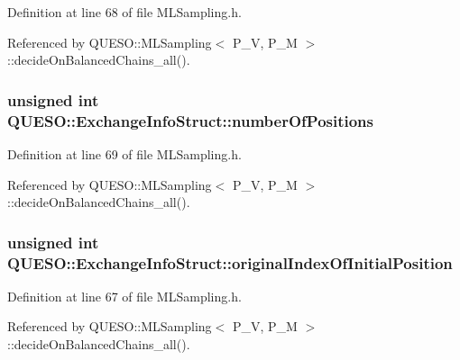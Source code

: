 Definition at line 68 of file M\-L\-Sampling.\-h.



Referenced by Q\-U\-E\-S\-O\-::\-M\-L\-Sampling$<$ P\-\_\-\-V, P\-\_\-\-M $>$\-::decide\-On\-Balanced\-Chains\-\_\-all().

\hypertarget{struct_q_u_e_s_o_1_1_exchange_info_struct_a4f2b2dace4f5ef2c7f9cf047150b31f1}{
\subsubsection[{number\-Of\-Positions}]{\setlength{\rightskip}{0pt plus 5cm}unsigned int Q\-U\-E\-S\-O\-::\-Exchange\-Info\-Struct\-::number\-Of\-Positions}}\label{struct_q_u_e_s_o_1_1_exchange_info_struct_a4f2b2dace4f5ef2c7f9cf047150b31f1}


Definition at line 69 of file M\-L\-Sampling.\-h.



Referenced by Q\-U\-E\-S\-O\-::\-M\-L\-Sampling$<$ P\-\_\-\-V, P\-\_\-\-M $>$\-::decide\-On\-Balanced\-Chains\-\_\-all().

\hypertarget{struct_q_u_e_s_o_1_1_exchange_info_struct_a0ee7553d2094320561b274bc1fe4e546}{
\subsubsection[{original\-Index\-Of\-Initial\-Position}]{\setlength{\rightskip}{0pt plus 5cm}unsigned int Q\-U\-E\-S\-O\-::\-Exchange\-Info\-Struct\-::original\-Index\-Of\-Initial\-Position}}\label{struct_q_u_e_s_o_1_1_exchange_info_struct_a0ee7553d2094320561b274bc1fe4e546}


Definition at line 67 of file M\-L\-Sampling.\-h.



Referenced by Q\-U\-E\-S\-O\-::\-M\-L\-Sampling$<$ P\-\_\-\-V, P\-\_\-\-M $>$\-::decide\-On\-Balanced\-Chains\-\_\-all().

